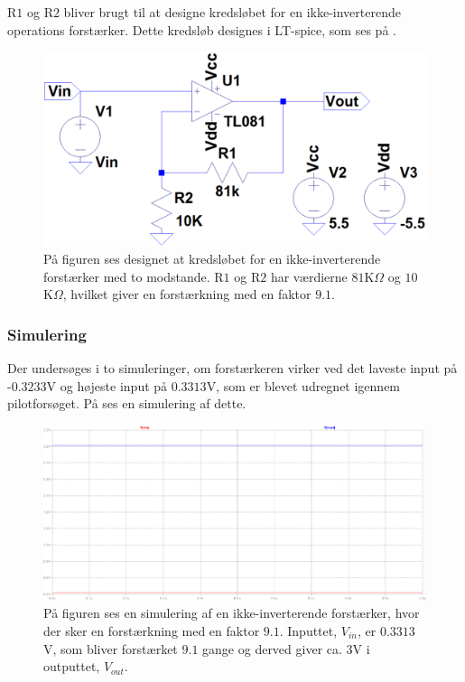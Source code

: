 \noindent R$1$ og R$2$ bliver brugt til at designe kredsløbet for en ikke-inverterende operations forstærker. Dette kredsløb designes i LT-spice, som ses på . 
\begin{figure}[H]
\centering
\includegraphics[scale=0.3]{figures/cProblemloesning/Forstaerker_faktor18.PNG}
\caption{På figuren ses designet at kredsløbet for en ikke-inverterende forstærker med to modstande. R$1$ og R$2$ har værdierne $81$K$\Omega$ og $10$K$\Omega$, hvilket giver en forstærkning med en faktor $9.1$.}
\label{fig:Forstaerker_faktor18}
\end{figure} 

\subsubsection{Simulering}\label{Subsec:Forstaerker_simu}
Der undersøges i to simuleringer, om forstærkeren virker ved det laveste input på -$0.3233$V og højeste input på $0.3313$V, som er blevet udregnet igennem pilotforsøget. På  ses en simulering af dette.

\begin{figure}[H]
\centering
\includegraphics[scale=0.3]{figures/cProblemloesning/Forstaerker_faktor18_simulering.PNG}
\caption{På figuren ses en simulering af en ikke-inverterende forstærker, hvor der sker en forstærkning med en faktor $9.1$. Inputtet, $V_{in}$, er $0.3313$V, som bliver forstærket $9.1$ gange og derved giver ca. $3$V i outputtet, $V_{out}$.}
\label{fig:Forstaerker_faktor18_simulering}
\end{figure}

